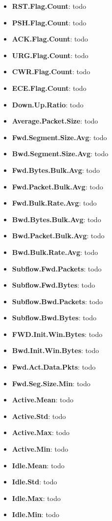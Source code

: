 \begin{itemize}
    \item \textbf{RST.Flag.Count}: todo
    \item \textbf{PSH.Flag.Count}: todo
    \item \textbf{ACK.Flag.Count}: todo
    \item \textbf{URG.Flag.Count}: todo
    \item \textbf{CWR.Flag.Count}: todo
    \item \textbf{ECE.Flag.Count}: todo
    \item \textbf{Down.Up.Ratio}: todo
    \item \textbf{Average.Packet.Size}: todo
    \item \textbf{Fwd.Segment.Size.Avg}: todo
    \item \textbf{Bwd.Segment.Size.Avg}: todo
    \item \textbf{Fwd.Bytes.Bulk.Avg}: todo
    \item \textbf{Fwd.Packet.Bulk.Avg}: todo
    \item \textbf{Fwd.Bulk.Rate.Avg}: todo
    \item \textbf{Bwd.Bytes.Bulk.Avg}: todo
    \item \textbf{Bwd.Packet.Bulk.Avg}: todo
    \item \textbf{Bwd.Bulk.Rate.Avg}: todo
    \item \textbf{Subflow.Fwd.Packets}: todo
    \item \textbf{Subflow.Fwd.Bytes}: todo
    \item \textbf{Subflow.Bwd.Packets}: todo
    \item \textbf{Subflow.Bwd.Bytes}: todo
    \item \textbf{FWD.Init.Win.Bytes}: todo
    \item \textbf{Bwd.Init.Win.Bytes}: todo
    \item \textbf{Fwd.Act.Data.Pkts}: todo
    \item \textbf{Fwd.Seg.Size.Min}: todo
    \item \textbf{Active.Mean}: todo
    \item \textbf{Active.Std}: todo
    \item \textbf{Active.Max}: todo
    \item \textbf{Active.Min}: todo
    \item \textbf{Idle.Mean}: todo
    \item \textbf{Idle.Std}: todo
    \item \textbf{Idle.Max}: todo
    \item \textbf{Idle.Min}: todo
\end{itemize}

